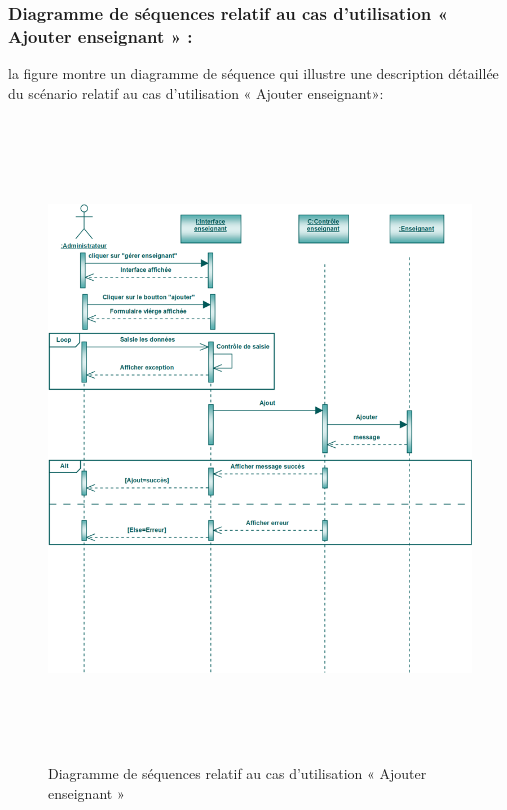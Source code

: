 \documentclass[12 pt ]{report}
\begin{document}
\subsubsection{Diagramme de séquences relatif au cas d’utilisation « Ajouter enseignant » :}
la figure   montre un diagramme de séquence qui illustre une description détaillée du scénario relatif au cas d’utilisation « Ajouter enseignant»: 
{\begin{figure}[h]
 \begin{center}
\includegraphics[width= 18 cm ,height=  17cm]{sae.PNG}
\caption{Diagramme de séquences relatif au cas d’utilisation « Ajouter enseignant »}

\end{center}
\end{figure}}
\newpage
\end{document}

